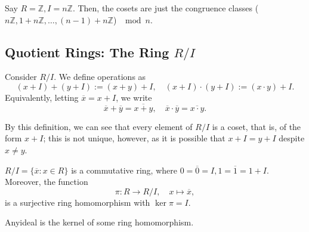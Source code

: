 \documentclass[12pt,oneside]{article}
\begin{document}
\begin{example}
  Say $R = \mathbb{Z}, I = n \mathbb{Z}$. Then, the cosets are just the congruence classes ($n \mathbb{Z}, 1 + n \mathbb{Z} , \dots, (n-1) + n \mathbb{Z}$) $\mod n$.
\end{example}

\subsection{Quotient Rings: \texorpdfstring{The Ring $R/I$}{The Ring R/I}}

\begin{definition}
  Consider \footnotemark $R / I$. We define operations as \[
  (x+I) + (y+I) := (x+y) + I, \quad (x + I) \cdot (y+I) := (x\cdot y) + I.  
  \]
  Equivalently, letting $\overline{x} = x + I$, we write \[
  \overline{x}  + \overline{y} = \overline{x+y}, \quad \overline{x} \cdot \overline{y} = \overline{x\cdot y}.
  \]

\end{definition}



\begin{remark}
  By this definition, we can see that every element of $R / I$ is a coset, that is, of the form $x + I$; this is not unique, however, as it is possible that $x + I = y + I$ despite $x \neq y$.
\end{remark}

\begin{theorem}\label{thm:rmodicommutativering}
  $R/I = \{\overline{x} : x \in R\}$ is a commutative ring, where $0 = \overline{0} = I, 1 = \overline{1} = 1 + I$. Moreover, the function \[
  \pi : R \to R /I, \quad x \mapsto \overline{x},  
  \]
  is a surjective ring homomorphism with $\ker \pi = I$.
\end{theorem}

\begin{corollary}
  Any\footnotemark ideal is the kernel of some ring homomorphism.
\end{corollary}
\end{document}

